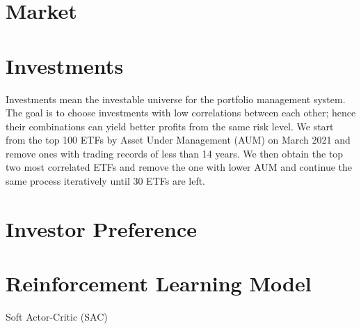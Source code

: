 \section{Market}
\section{Investments}
Investments mean the investable universe for the portfolio management system. The goal is to choose investments with low correlations between each other; hence their combinations can yield better profits from the same risk level. We start from the top 100 ETFs by Asset Under Management (AUM) on March 2021 and remove ones with trading records of less than 14 years. We then obtain the top two most correlated ETFs and remove the one with lower AUM and continue the same process iteratively until 30 ETFs are left.
\section{Investor Preference}
\section{Reinforcement Learning Model}
Soft Actor-Critic (SAC)\cite{haarnoja2018soft}